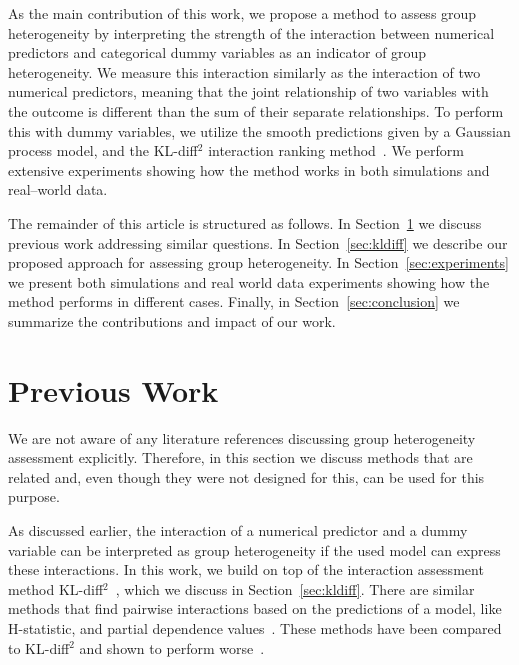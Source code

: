 \documentclass{article}
\begin{document}
%
%
%

%
%


%
%
%



As the main contribution of this work, we propose a method to assess group heterogeneity
%
%
by interpreting the strength of the interaction between numerical predictors and categorical dummy variables as an indicator of group heterogeneity.
We measure this interaction similarly as the interaction of two numerical predictors,
meaning that the joint relationship of two variables with the outcome is different than the
sum of their separate relationships. To perform this with dummy variables, we utilize
the smooth predictions given by
a Gaussian process model, and the KL-diff$^2$ interaction ranking method~\cite{paananen2019ranking}.
We perform extensive experiments showing how the method works in both simulations and real--world data.

%
%
%
%
%
%
%
%


%
%
%
%
%
%
%

%
%
%
%
%
%
%
%
%
%
%
%
%
%


The remainder of this article is structured as follows. 
In Section~\ref{sec:previouswork} we discuss previous work addressing similar questions.
In Section~\ref{sec:kldiff} we describe 
%
our proposed approach for assessing group heterogeneity.
In Section~\ref{sec:experiments} we present both simulations and real world data experiments showing how the method performs in different cases.
Finally, in Section~\ref{sec:conclusion} we summarize the contributions and impact of our work.


%
%
%
%
%
%
%
%
%
%
%
%
%
%
%
%
%
%
%
%
%
%

\section{Previous Work}
\label{sec:previouswork}

%
%
%

We are not aware of any literature references discussing group heterogeneity assessment explicitly.
Therefore, in this section we discuss methods that are related and, even though they were not designed for this, can be used for this purpose.
%
%

%
%
%

As discussed earlier, the interaction of a numerical predictor and a dummy variable can be
interpreted as group heterogeneity if the used model can express these interactions.
In this work, we build on top of the interaction assessment method KL-diff$^2$~\cite{paananen2019ranking}, which we discuss in Section~\ref{sec:kldiff}.
%
%
%
%
%
%
%
%
%
There are similar methods that find pairwise interactions based on the predictions of a model, like H-statistic, and partial dependence values~\cite{friedman2008predictive,greenwell2018simple}. 
These methods have been compared to KL-diff$^2$ and shown to perform worse~\cite{paananen2019ranking}.
\end{document}
